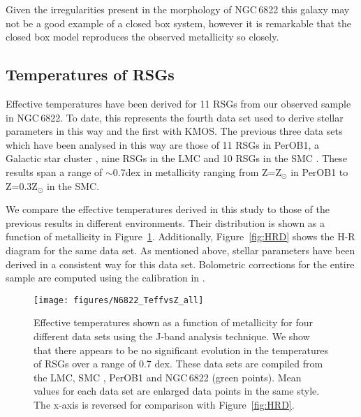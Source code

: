 \documentclass[iop]{emulateapj}
\begin{document}
Given the irregularities present in the morphology of NGC\,6822 this galaxy may not be a good example of a closed box system, however it is remarkable that the closed box model reproduces the observed metallicity so closely.





\subsection{Temperatures of RSGs} %
\label{sub:temperatures_of_rsgs}

Effective temperatures have been derived for 11 RSGs from our observed sample in NGC\,6822.
To date, this represents the fourth data set used to derive stellar parameters in this way and the first with KMOS.
The previous three data sets which have been analysed in this way are those of 11 RSGs in PerOB1,
a Galactic star cluster
\citep{2014ApJ...788...58G}, nine RSGs in the LMC and 10 RSGs in the SMC
\citep[both from][]{Davies14}.
These results span a range of $\sim$0.7dex in metallicity ranging from Z=Z$_{\odot}$ in PerOB1 to Z=0.3Z$_{\odot}$ in the SMC.

We compare the effective temperatures derived in this study to those of the previous results in different environments.
Their distribution is shown as a function of metallicity in Figure~\ref{fig:TvsZ}.
Additionally, Figure~\ref{fig:HRD} shows the H-R diagram for the same data set.
As mentioned above, stellar parameters have been derived in a consistent way for this data set. 
Bolometric corrections for the entire sample are computed using the calibration in
\cite{Davies13a}.


\begin{figure}
\texttt{[image: figures/N6822\_TeffvsZ\_all]}
\caption{
Effective temperatures shown as a function of metallicity for four different data sets using the J-band analysis technique.
We show that there appears to be no significant evolution in the temperatures of RSGs over a range of 0.7 dex.
These data sets are compiled from the LMC, SMC
\protect\citep[blue and red points respectively;][]{Davies14}, PerOB1
\protect\citep[a Galactic RSG cluster; cyan points;][]{2014ApJ...788...58G} and NGC\,6822
(green points).
Mean values for each data set are enlarged data points in the same style.
The x-axis is reversed for comparison with Figure~\ref{fig:HRD}.\label{fig:TvsZ}
         }
\end{figure}
\end{document}
